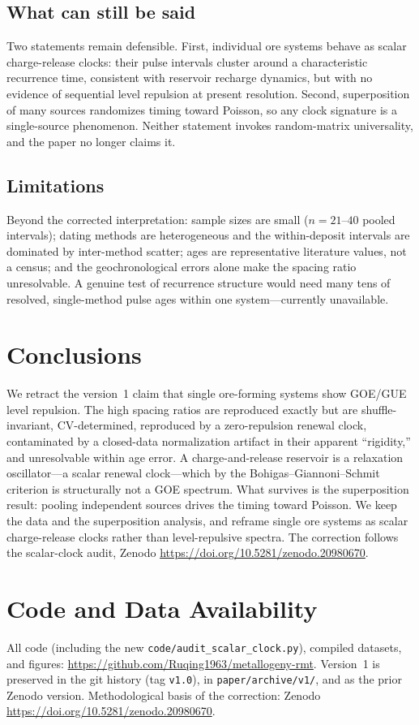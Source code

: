 \documentclass[12pt,a4paper]{article}
\begin{document}
\subsection{What can still be said}
Two statements remain defensible. First, individual ore systems behave as scalar
charge-release clocks: their pulse intervals cluster around a characteristic
recurrence time, consistent with reservoir recharge dynamics, but with no evidence
of sequential level repulsion at present resolution. Second, superposition of many
sources randomizes timing toward Poisson, so any clock signature is a single-source
phenomenon. Neither statement invokes random-matrix universality, and the paper no
longer claims it.

\subsection{Limitations}
Beyond the corrected interpretation: sample sizes are small ($n=21$--$40$ pooled
intervals); dating methods are heterogeneous and the within-deposit intervals are
dominated by inter-method scatter; ages are representative literature values, not a
census; and the geochronological errors alone make the spacing ratio unresolvable.
A genuine test of recurrence structure would need many tens of resolved,
single-method pulse ages within one system---currently unavailable.

\section{Conclusions}
We retract the version~1 claim that single ore-forming systems show GOE/GUE level
repulsion. The high spacing ratios are reproduced exactly but are shuffle-invariant,
CV-determined, reproduced by a zero-repulsion renewal clock, contaminated by a
closed-data normalization artifact in their apparent ``rigidity,'' and unresolvable
within age error. A charge-and-release reservoir is a relaxation oscillator---a
scalar renewal clock---which by the Bohigas--Giannoni--Schmit criterion is
structurally not a GOE spectrum. What survives is the superposition result:
pooling independent sources drives the timing toward Poisson. We keep the data and
the superposition analysis, and reframe single ore systems as scalar
charge-release clocks rather than level-repulsive spectra. The correction follows
the scalar-clock audit, Zenodo \url{https://doi.org/10.5281/zenodo.20980670}.

\section*{Code and Data Availability}
All code (including the new \texttt{code/audit\_scalar\_clock.py}), compiled
datasets, and figures: \url{https://github.com/Ruqing1963/metallogeny-rmt}.
Version~1 is preserved in the git history (tag \texttt{v1.0}), in
\texttt{paper/archive/v1/}, and as the prior Zenodo version. Methodological basis
of the correction: Zenodo \url{https://doi.org/10.5281/zenodo.20980670}.
\end{document}
